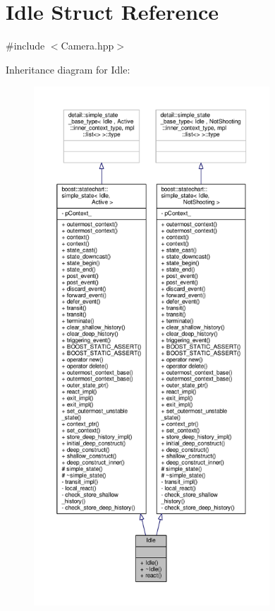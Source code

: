 \hypertarget{struct_idle}{}\section{Idle Struct Reference}
\label{struct_idle}


{\ttfamily \#include $<$Camera.\+hpp$>$}



Inheritance diagram for Idle\+:
\nopagebreak
\begin{figure}[H]
\begin{center}
\leavevmode
\includegraphics[height=550pt]{struct_idle__inherit__graph}
\end{center}
\end{figure}


